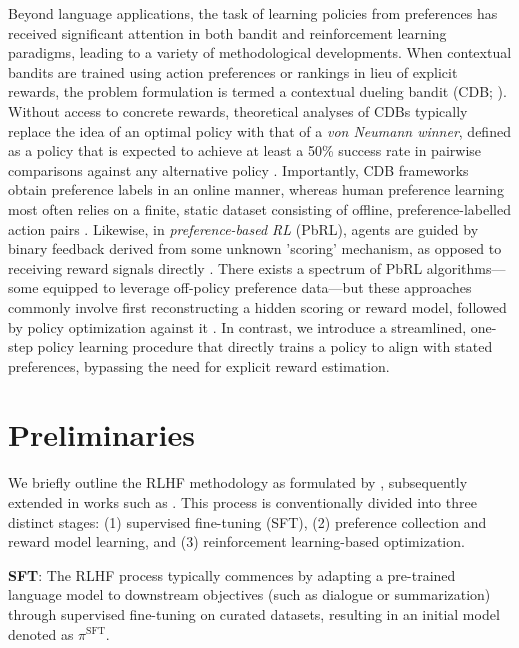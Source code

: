 Beyond language applications, the task of learning policies from preferences has received significant attention in both bandit and reinforcement learning paradigms, leading to a variety of methodological developments. When contextual bandits are trained using action preferences or rankings in lieu of explicit rewards, the problem formulation is termed a contextual dueling bandit (CDB; \cite{yue2012karmed,dudik2015contextual}). Without access to concrete rewards, theoretical analyses of CDBs typically replace the idea of an optimal policy with that of a \textit{von Neumann winner}, defined as a policy that is expected to achieve at least a 50\% success rate in pairwise comparisons against any alternative policy \citep{dudik2015contextual}. Importantly, CDB frameworks obtain preference labels in an online manner, whereas human preference learning most often relies on a finite, static dataset consisting of offline, preference-labelled action pairs \citep{yan2022human}. Likewise, in \textit{preference-based RL} (PbRL), agents are guided by binary feedback derived from some unknown 'scoring' mechanism, as opposed to receiving reward signals directly \citep{BusaFekete2014,ruiz2023dueling}. There exists a spectrum of PbRL algorithms—some equipped to leverage off-policy preference data—but these approaches commonly involve first reconstructing a hidden scoring or reward model, followed by policy optimization against it \citep{jain2013learning,BusaFekete2014,christiano2017deep,sadigh2017active,kupcsik2018learning}. In contrast, we introduce a streamlined, one-step policy learning procedure that directly trains a policy to align with stated preferences, bypassing the need for explicit reward estimation.

\section{Preliminaries}\label{section:prelims}

We briefly outline the RLHF methodology as formulated by \citeauthor{ziegler2020finetuning}, subsequently extended in works such as \citep{stiennon2022learning, bai2022training, ouyang2022training}. This process is conventionally divided into three distinct stages: (1) supervised fine-tuning (SFT), (2) preference collection and reward model learning, and (3) reinforcement learning-based optimization.

\textbf{SFT}: The RLHF process typically commences by adapting a pre-trained language model to downstream objectives (such as dialogue or summarization) through supervised fine-tuning on curated datasets, resulting in an initial model denoted as $\pi^\text{SFT}$.

